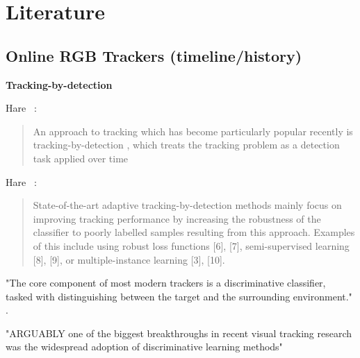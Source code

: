 \chapter{Literature}



\section{Online RGB Trackers (timeline/history)}

\textbf{Tracking-by-detection}

Hare \etal~\cite{hare2014struck}:

\blockquote{An approach to tracking which has become particularly
popular recently is tracking-by-detection \cite{avidan2004support}, which treats
the tracking problem as a detection task applied over time}

Hare \etal~\cite{hare2014struck}:
\blockquote{State-of-the-art adaptive tracking-by-detection methods mainly
focus on improving tracking performance by increasing
the robustness of the classifier to poorly labelled samples
resulting from this approach. Examples of this include using
robust loss functions [6], [7], semi-supervised learning [8],
[9], or multiple-instance learning [3], [10].} 


"The core component of most modern trackers is a discriminative classifier, tasked with distinguishing between the target
and the surrounding environment." \cite{henriques2015tracking}.

"ARGUABLY one of the biggest breakthroughs in recent
visual tracking research was the widespread adoption
of discriminative learning methods" \cite{henriques2015tracking}

